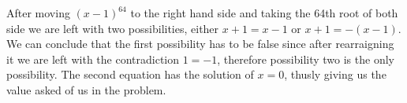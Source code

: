 \documentclass{article}
\theoremstyle{maintheorem}
\begin{document}
After moving $(x - 1)^{64}$ to the right hand side and taking the 64th root of both side we are left with two possibilities,
either $x + 1 = x - 1$ or $x + 1 = -(x - 1)$. We can conclude that the first possibility has to be false since after rearraigning it we are left with the contradiction $1 = -1$, therefore possibility two is the only possibility.
The second equation has the solution of $x = 0$, thusly giving us the value asked of us in the problem.
\end{document}
